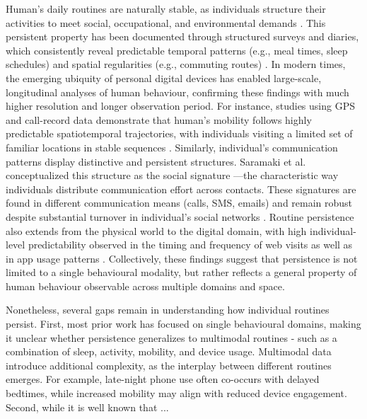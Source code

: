 \documentclass[pdflatex,sn-vancouver,Numbered]{bst/sn-jnl}%
\theoremstyle{thmstyleone}%
\theoremstyle{thmstyletwo}%
\theoremstyle{thmstylethree}%
\begin{document}
Human's daily routines are naturally stable, as individuals structure their activities to meet social, occupational, and environmental demands \cite{monk1994regularity}. This persistent property has been documented through structured surveys and diaries, which consistently reveal predictable temporal patterns (e.g., meal times, sleep schedules) and spatial regularities (e.g., commuting routes) \cite{hansonSystematicVariabilityRepetitious1988a, monk1990social, soehnerCircadianPreferenceSleepWake2011}. In modern times, the emerging ubiquity of personal digital devices has enabled large-scale, longitudinal analyses of human behaviour, confirming these findings with much higher resolution and longer observation period. For instance, studies using GPS and call-record data demonstrate that human's mobility follows highly predictable spatiotemporal trajectories, with individuals visiting a limited set of familiar locations in stable sequences \cite{songLimitsPredictabilityHuman2010, song2010modelling, alessandretti2020scales}. Similarly, individual's communication patterns display distinctive and persistent structures. Saramaki et al. conceptualized this structure as the social signature \cite{saramaki2014persistence}—the characteristic way individuals distribute communication effort across contacts. These signatures are found in different communication means (calls, SMS, emails) and remain robust despite substantial turnover in individual's social networks \cite{saramaki2014persistence, aledavoodDailyRhythmsMobile2015a, heydari2018multichannel, loriteLongTermEvolutionEmail2016}. Routine persistence also extends from the physical world to the digital domain, with high individual-level predictability observed in the timing and frequency of web visits \cite{barbosa2016returners, hu2018life, kulshrestha2021web} as well as in app usage patterns \cite{malmi2016you, kosinski2013private, petersSocialMediaUse2024}. Collectively, these findings suggest that persistence is not limited to a single behavioural modality, but rather reflects a general property of human behaviour observable across multiple domains and space.

Nonetheless, several gaps remain in understanding how individual routines persist. First, most prior work has focused on single behavioural domains, making it unclear whether persistence generalizes to multimodal routines - such as a combination of sleep, activity, mobility, and device usage. Multimodal data introduce additional complexity, as the interplay between different routines emerges. For example, late-night phone use often co-occurs with delayed bedtimes, while increased mobility may align with reduced device engagement. Second, while it is well known that ...
\end{document}
